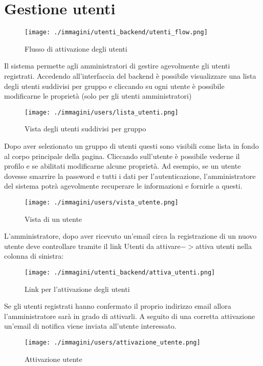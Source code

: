 \chapter{Gestione utenti}


\begin{figure}[H]
 \centering
 \texttt{[image: ./immagini/utenti\_backend/utenti\_flow.png]}
 \caption{Flusso di attivazione degli utenti}
 \label{fig:utenti_flow}
\end{figure}


Il sistema permette agli amministratori di gestire agevolmente gli utenti registrati. Accedendo all'interfaccia del backend è possibile visualizzare una lista degli utenti suddivisi per gruppo e cliccando su ogni utente è possibile modificarne le proprietà (solo per gli utenti amministratori)




\begin{figure}[H]
 \centering
 \texttt{[image: ./immagini/users/lista\_utenti.png]}
 \caption{Vista degli utenti suddivisi per gruppo}
 \label{fig:users_list}
\end{figure}

Dopo aver selezionato un gruppo di utenti questi sono visibili come lista in fondo al corpo  principale della pagina. Cliccando sull'utente è possibile vederne il profilo e se abilitati modificarne alcune proprietà. Ad esempio, se un utente dovesse smarrire la password e tutti i dati per l'autenticazione, l'amministratore del sistema potrà agevolmente recuperare le informazioni e fornirle a questi.

\begin{figure}[H]
 \centering
 \texttt{[image: ./immagini/users/vista\_utente.png]}
 \caption{Vista di un utente}
 \label{fig:one_user}
\end{figure}
L'amministratore, dopo aver ricevuto un'email circa la registrazione di un nuovo utente deve controllare tramite il link Utenti da attivare$->$attiva utenti nella colonna di sinistra:
\begin{figure}[H]
 \centering
 \texttt{[image: ./immagini/utenti\_backend/attiva\_utenti.png]}
 \caption{Link per l'attivazione degli utenti}
 \label{fig:attiva_utenti}
\end{figure}
Se gli utenti registrati hanno confermato il proprio indirizzo email allora l'amministratore sarà in grado di attivarli. A seguito di una corretta attivazione un'email di notifica viene inviata all'utente interessato.
\begin{figure}[H]
 \centering
 \texttt{[image: ./immagini/users/attivazione\_utente.png]}
 \caption{Attivazione utente}
 \label{fig:user_activation}
\end{figure}


